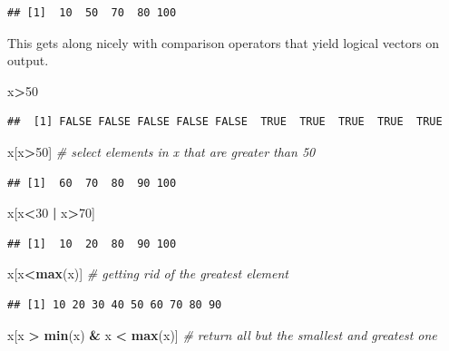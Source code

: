 \documentclass[10pt,b5paper,krantz1]{krantz}
\newenvironment{Shaded}{\begin{snugshade}}{\end{snugshade}}
\newcommand{\CommentTok}[1]{\textcolor[rgb]{0.37,0.37,0.37}{\textit{#1}}}
\newcommand{\DecValTok}[1]{\textcolor[rgb]{0.06,0.06,0.06}{#1}}
\newcommand{\KeywordTok}[1]{\textcolor[rgb]{0.27,0.27,0.27}{\textbf{#1}}}
\newcommand{\NormalTok}[1]{#1}
\newcommand{\OperatorTok}[1]{\textcolor[rgb]{0.43,0.43,0.43}{\textbf{#1}}}
\newcommand{\StringTok}[1]{\textcolor[rgb]{0.5,0.5,0.5}{#1}}
\begin{document}
\begin{verbatim}
## [1]  10  50  70  80 100
\end{verbatim}

This gets along nicely with comparison operators that yield logical vectors
on output.

\begin{Shaded}
\begin{Highlighting}[]
\NormalTok{x}\OperatorTok{>}\DecValTok{50}
\end{Highlighting}
\end{Shaded}

\begin{verbatim}
##  [1] FALSE FALSE FALSE FALSE FALSE  TRUE  TRUE  TRUE  TRUE  TRUE
\end{verbatim}

\begin{Shaded}
\begin{Highlighting}[]
\NormalTok{x[x}\OperatorTok{>}\DecValTok{50}\NormalTok{] }\CommentTok{# select elements in x that are greater than 50}
\end{Highlighting}
\end{Shaded}

\begin{verbatim}
## [1]  60  70  80  90 100
\end{verbatim}

\begin{Shaded}
\begin{Highlighting}[]
\NormalTok{x[x}\OperatorTok{<}\DecValTok{30} \OperatorTok{|}\StringTok{ }\NormalTok{x}\OperatorTok{>}\DecValTok{70}\NormalTok{]}
\end{Highlighting}
\end{Shaded}

\begin{verbatim}
## [1]  10  20  80  90 100
\end{verbatim}

\begin{Shaded}
\begin{Highlighting}[]
\NormalTok{x[x}\OperatorTok{<}\KeywordTok{max}\NormalTok{(x)] }\CommentTok{# getting rid of the greatest element}
\end{Highlighting}
\end{Shaded}

\begin{verbatim}
## [1] 10 20 30 40 50 60 70 80 90
\end{verbatim}

\begin{Shaded}
\begin{Highlighting}[]
\NormalTok{x[x }\OperatorTok{>}\StringTok{ }\KeywordTok{min}\NormalTok{(x) }\OperatorTok{&}\StringTok{ }\NormalTok{x }\OperatorTok{<}\StringTok{ }\KeywordTok{max}\NormalTok{(x)] }\CommentTok{# return all but the smallest and greatest one}
\end{Highlighting}
\end{Shaded}
\end{document}
